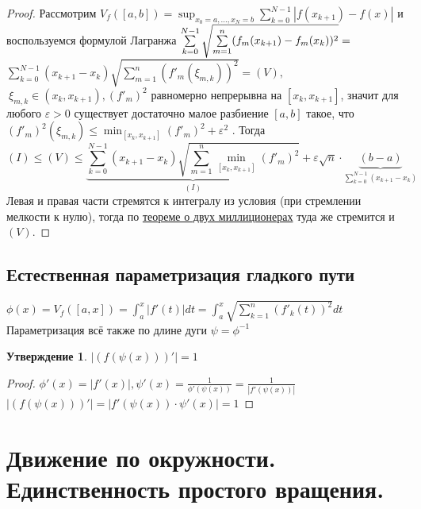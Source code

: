 \documentclass{article}
\theoremstyle{indented}
\newtheorem{stat}{Утверждение}
\theoremstyle{definition}
\theoremstyle{remark}
\begin{document}
\begin{proof}
    Рассмотрим $V_f([a,b]) = \displaystyle \sup_{x_0=a, ..., x_N = b} \sum\limits_{k=0}^{N-1} |f(x_{k+1})-f(x)|$ и 
    воспользуемся формулой Лагранжа $\sum\limits_{k=0}^{N-1} \sqrt{\sum\limits_{m=1}^{n}(f_m(x_{k+1})-f_m(x_k))^2} = \\$
    $\sum\limits_{k=0}^{N-1} (x_{k+1}-x_k) \sqrt{\sum\limits_{m=1}^{n} (f'_m(\xi_{m,k}))^2}=(V),$
    $\ \xi_{m,k} \in (x_k,x_{k+1}), (f'_m)^2$ равномерно непрерывна на $[x_k, x_{k+1}]$, значит для любого $\varepsilon > 0$ 
    существует достаточно малое разбиение $[a,b]$ такое, что 
    $(f'_m)^2(\xi_{m,k}) \leq \min_{[x_k, x_{k+1}]} (f'_m)^2 + \varepsilon^2$ . Тогда
    \[  (I) \leq (V) \leq \underbrace{\sum\limits_{k=0}^{N-1} (x_{k+1}-x_k) \sqrt{\sum\limits_{m=1}^{n} \min_{[x_k, x_{k+1}]} (f'_m)^2}}_{(I)} 
    +  \varepsilon \sqrt{n} \cdot \underbrace{(b-a)}_{\sum\limits_{k=0}^{N-1} (x_{k+1}-x_k)} \]
    Левая и правая части стремятся к интегралу из условия (при стремлении 
    мелкости к нулю), тогда по \href{https://ru.wikipedia.org/wiki/%D0%A2%D0%B5%D0%BE%D1%80%D0%B5%D0%BC%D0%B0_%D0%BE_%D0%B4%D0%B2%D1%83%D1%85_%D0%BC%D0%B8%D0%BB%D0%B8%D1%86%D0%B8%D0%BE%D0%BD%D0%B5%D1%80%D0%B0%D1%85}
    {теореме о двух миллиционерах} туда же стремится и $(V)$.
\end{proof}

\subsection*{Естественная параметризация гладкого пути}

$\displaystyle \phi(x)=V_f([a,x])=\int_{a}^{x} |f'(t)| dt = \int_{a}^{x}{\sqrt{\sum\limits_{k=1}^{n}(f'_k(t))^2}} dt$\\
Параметризация всё также по длине дуги $\psi = \phi^{-1}$
\begin{stat}
    $|(f(\psi(x)))'|=1$
\end{stat}

\begin{proof}
    $\phi'(x)=|f'(x)|, \psi'(x)=\frac{1}{\phi'(\psi(x))}=\frac{1}{|f'(\psi(x))|}$\\
    $|(f(\psi(x)))'|=|f'(\psi(x))\cdot\psi'(x)|=1$
\end{proof}

\section{Движение по окружности. Единственность простого вращения.}
\end{document}
